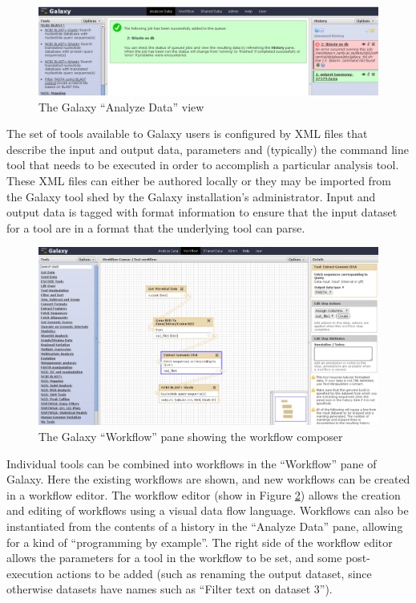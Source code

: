 \documentclass[a4paper,10pt]{scrreprt} \usepackage[utf8]{inputenc}
\begin{document}
\begin{figure}[h]
\centering
\includegraphics[width=\textwidth]{images/GalaxyAnalysisScreenshot}
\caption{The Galaxy ``Analyze Data'' view}
\label{fig:GalaxyAnalysisScreenshot}
\end{figure}

The set of tools available to Galaxy users is configured by XML files that describe the input and output data, parameters and (typically) the command line tool that needs to be executed in order to accomplish a particular analysis tool. These XML files can either be authored locally or they may be imported from the Galaxy tool shed \cite{the_galaxy_team_galaxy_2011} by the Galaxy installation's administrator. Input and output data is tagged with format information to ensure that the input dataset for a tool are in a format that the underlying tool can parse.

\begin{figure}[h]
\centering
\includegraphics[width=\textwidth]{images/GalaxyWorkflowScreenshot}
\caption{The Galaxy ``Workflow'' pane showing the workflow composer}
\label{fig:GalaxyWorkflowScreenshot}
\end{figure}

Individual tools can be combined into workflows in the ``Workflow'' pane of Galaxy. Here the existing workflows are shown, and new workflows can be created in a workflow editor. The workflow editor (show in Figure \ref{fig:GalaxyWorkflowScreenshot}) allows the creation and editing of workflows using a visual data flow language. Workflows can also be instantiated from the contents of a history in the ``Analyze Data'' pane, allowing for a kind of ``programming by example''. The right side of the workflow editor allows the parameters for a tool in the workflow to be set, and some post-execution actions to be added (such as renaming the output dataset, since otherwise datasets have names such as ``Filter text on dataset 3'').
\end{document}
